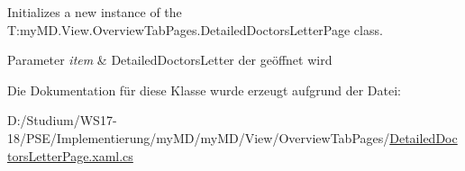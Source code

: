 Initializes a new instance of the T\+:my\+M\+D.\+View.\+Overview\+Tab\+Pages.\+Detailed\+Doctors\+Letter\+Page class. 


\begin{DoxyParams}{Parameter}
{\em item} & Detailed\+Doctors\+Letter der geöffnet wird\\
\hline
\end{DoxyParams}


Die Dokumentation für diese Klasse wurde erzeugt aufgrund der Datei\+:\begin{DoxyCompactItemize}
\item 
D\+:/\+Studium/\+W\+S17-\/18/\+P\+S\+E/\+Implementierung/my\+M\+D/my\+M\+D/\+View/\+Overview\+Tab\+Pages/\mbox{\hyperlink{_detailed_doctors_letter_page_8xaml_8cs}{Detailed\+Doctors\+Letter\+Page.\+xaml.\+cs}}\end{DoxyCompactItemize}
